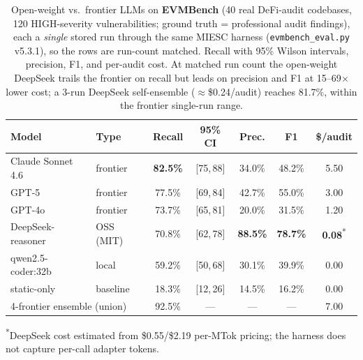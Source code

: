 \documentclass[a4paper,11pt]{article}
\begin{document}
\begin{table}[t]
\centering
\small
\caption{Open-weight vs.\ frontier LLMs on \textbf{EVMBench} (40 real DeFi-audit
codebases, 120 HIGH-severity vulnerabilities; ground truth = professional audit
findings), each a \emph{single} stored run through the same MIESC harness
(\texttt{evmbench\_eval.py} v5.3.1), so the rows are run-count matched. Recall
with 95\% Wilson intervals, precision, F1, and per-audit cost. At matched run
count the open-weight DeepSeek trails the frontier on recall but leads on
precision and F1 at 15--69$\times$ lower cost; a 3-run DeepSeek self-ensemble
($\approx$\$0.24/audit) reaches 81.7\%, within the frontier single-run range.}
\label{tab:evmbench}
\begin{tabular}{llccccc}
\toprule
Model & Type & Recall & 95\% CI & Prec. & F1 & \$/audit \\
\midrule
Claude Sonnet 4.6   & frontier    & \textbf{82.5\%} & [75,\,88] & 34.0\% & 48.2\% & 5.50 \\
GPT-5               & frontier    & 77.5\%          & [69,\,84] & 42.7\% & 55.0\% & 3.00 \\
GPT-4o              & frontier    & 73.7\%          & [65,\,81] & 20.0\% & 31.5\% & 1.20 \\
DeepSeek-reasoner   & OSS (MIT)   & 70.8\%          & [62,\,78] & \textbf{88.5\%} & \textbf{78.7\%} & \textbf{0.08}\textsuperscript{*} \\
qwen2.5-coder:32b   & local       & 59.2\%          & [50,\,68] & 30.1\% & 39.9\% & 0.00 \\
static-only         & baseline    & 18.3\%          & [12,\,26] & 14.5\% & 16.2\% & 0.00 \\
\midrule
\multicolumn{2}{l}{4-frontier ensemble (union)} & 92.5\% & --- & --- & --- & 7.00 \\
\bottomrule
\end{tabular}

\vspace{2pt}
{\footnotesize\textsuperscript{*}DeepSeek cost estimated from \$0.55/\$2.19 per-MTok
pricing; the harness does not capture per-call adapter tokens.}
\end{table}
\end{document}
